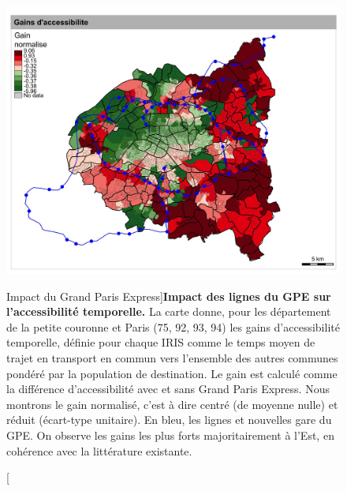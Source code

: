 \begin{figure}[h!]
	\includegraphics[width=\linewidth]{Figures/Final/1-2-1-fig-casestudies-gpe.jpg}
	\caption[Impact of \emph{Grand Paris Express}][Impact du Grand Paris Express]{\label{fig:casestudies:gpe}}{\textbf{Impact des lignes du GPE sur l'accessibilité temporelle.} La carte donne, pour les département de la petite couronne et Paris (75, 92, 93, 94) les gains d'accessibilité temporelle, définie pour chaque IRIS comme le temps moyen de trajet en transport en commun vers l'ensemble des autres communes pondéré par la population de destination. Le gain est calculé comme la différence d'accessibilité avec et sans Grand Paris Express. Nous montrons le gain normalisé, c'est à dire centré (de moyenne nulle) et réduit (écart-type unitaire). En bleu, les lignes et nouvelles gare du GPE. On observe les gains les plus forts majoritairement à l'Est, en cohérence avec la littérature existante.}
\end{figure}


